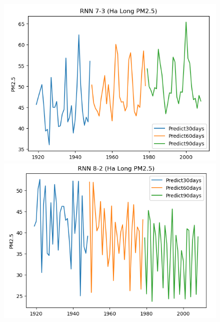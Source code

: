 \begin{figure}[H]
    \begin{minipage}{0.15\textwidth}
    \centering
    \includegraphics[width=1\textwidth]{img/final/RNN/90D/RNN_7_3_HL_90D.png}
    \end{minipage}
    \hfill
    \begin{minipage}{0.15\textwidth}
    \centering
    \includegraphics[width=1\textwidth]{img/final/RNN/90D/RNN_8_2_HL_90D.png}
    \end{minipage}
    \hfill
    \begin{minipage}{0.15\textwidth}
    \centering

\end{minipage}
\end{figure}
